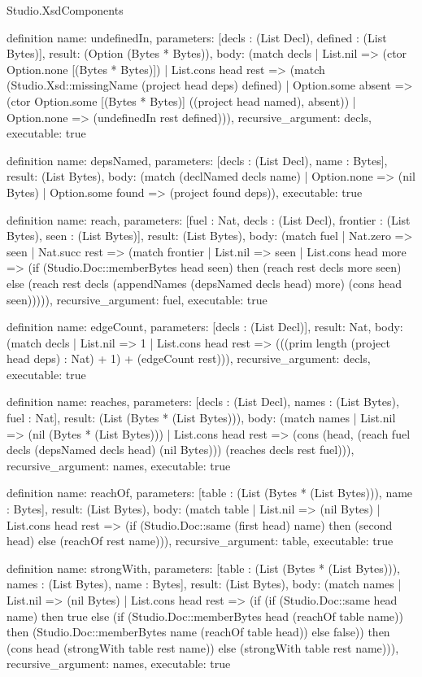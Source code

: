 \begin{lexlean}{Studio.XsdComponents}
\begin{semanticmodule}
definition{
  name: undefinedIn,
  parameters: [decls : (List Decl), defined : (List Bytes)],
  result: (Option (Bytes * Bytes)),
  body: (match decls
    | List.nil => (ctor Option.none [(Bytes * Bytes)])
    | List.cons head rest => (match (Studio.Xsd::missingName (project head deps) defined)
      | Option.some absent => (ctor Option.some [(Bytes * Bytes)] ((project head named), absent))
      | Option.none => (undefinedIn rest defined))),
  recursive_argument: decls,
  executable: true
}

definition{
  name: depsNamed,
  parameters: [decls : (List Decl), name : Bytes],
  result: (List Bytes),
  body: (match (declNamed decls name)
    | Option.none => (nil Bytes)
    | Option.some found => (project found deps)),
  executable: true
}

definition{
  name: reach,
  parameters: [fuel : Nat, decls : (List Decl), frontier : (List Bytes), seen : (List Bytes)],
  result: (List Bytes),
  body: (match fuel
    | Nat.zero => seen
    | Nat.succ rest => (match frontier
      | List.nil => seen
      | List.cons head more => (if (Studio.Doc::memberBytes head seen) then (reach rest decls more seen) else (reach rest decls (appendNames (depsNamed decls head) more) (cons head seen))))),
  recursive_argument: fuel,
  executable: true
}

definition{
  name: edgeCount,
  parameters: [decls : (List Decl)],
  result: Nat,
  body: (match decls
    | List.nil => 1
    | List.cons head rest => (((prim length (project head deps) : Nat) + 1) + (edgeCount rest))),
  recursive_argument: decls,
  executable: true
}

definition{
  name: reaches,
  parameters: [decls : (List Decl), names : (List Bytes), fuel : Nat],
  result: (List (Bytes * (List Bytes))),
  body: (match names
    | List.nil => (nil (Bytes * (List Bytes)))
    | List.cons head rest => (cons (head, (reach fuel decls (depsNamed decls head) (nil Bytes))) (reaches decls rest fuel))),
  recursive_argument: names,
  executable: true
}

definition{
  name: reachOf,
  parameters: [table : (List (Bytes * (List Bytes))), name : Bytes],
  result: (List Bytes),
  body: (match table
    | List.nil => (nil Bytes)
    | List.cons head rest => (if (Studio.Doc::same (first head) name) then (second head) else (reachOf rest name))),
  recursive_argument: table,
  executable: true
}

definition{
  name: strongWith,
  parameters: [table : (List (Bytes * (List Bytes))), names : (List Bytes), name : Bytes],
  result: (List Bytes),
  body: (match names
    | List.nil => (nil Bytes)
    | List.cons head rest => (if (if (Studio.Doc::same head name) then true else (if (Studio.Doc::memberBytes head (reachOf table name)) then (Studio.Doc::memberBytes name (reachOf table head)) else false)) then (cons head (strongWith table rest name)) else (strongWith table rest name))),
  recursive_argument: names,
  executable: true
}


\end{semanticmodule}
\end{lexlean}
